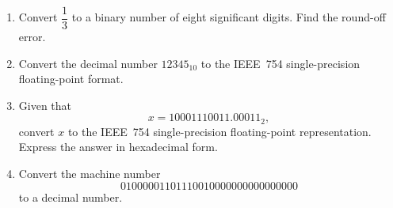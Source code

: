 \begin{enumerate}[
    label=\arabic*.,
    leftmargin=1.5em,
    itemsep=0.4em,
    parsep=0.1em
]
    \item Convert \(\dfrac{1}{3}\) to a binary number of eight significant
    digits. Find the round-off error.

    \item Convert the decimal number \(12345_{10}\) to the IEEE~754
    single-precision floating-point format.

    \item Given that
    \[
        x=10001110011.00011_2,
    \]
    convert \(x\) to the IEEE~754 single-precision floating-point
    representation. Express the answer in hexadecimal form.

    \item Convert the machine number
    \[
        01000001101110010000000000000000
    \]
    to a decimal number.

\end{enumerate}
